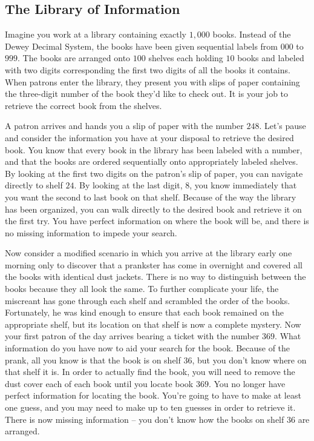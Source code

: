 \documentclass[11pt, oneside]{article}   	%
\begin{document}
\subsection{The Library of Information}
Imagine you work at a library containing exactly $1,000$ books.  Instead of the
Dewey Decimal System, the books have been given sequential labels from $000$ to
$999$.  The books are arranged onto $100$ shelves each holding $10$ books and
labeled with two digits corresponding the first two digits of all the books
it contains.  When patrons enter the library, they present you with slips of
paper containing the three-digit number of the book they'd like to check out.
It is your job to retrieve the correct book from the shelves.

A patron arrives and hands you a slip of paper with the number $248$. Let's
pause and consider the information you have at your disposal to retrieve the
desired book.  You know that every book in the library has been labeled with a
number, and that the books are ordered sequentially onto appropriately labeled
shelves.  By looking at the first two digits on the patron's slip of paper, you
can navigate directly to shelf $24$.  By looking at the last digit, $8$, you
know immediately that you want the second to last book on that shelf.  Because
of the way the library has been organized, you can walk directly to the desired
book and retrieve it on the first try.  You have perfect information on where
the book will be, and there is no missing information to impede your search.

Now consider a modified scenario in which you arrive at the library early one
morning only to discover that a prankster has come in overnight and covered all
the books with identical dust jackets.  There is no way to distinguish between
the books because they all look the same.  To further complicate your life, the
miscreant has gone through each shelf and scrambled the order of the books.
Fortunately, he was kind enough to ensure that each book remained on the
appropriate shelf, but its location on that shelf is now a complete mystery.
Now your first patron of the day arrives bearing a ticket with the number $369$.
What information do you have now to aid your search for the book.  Because of
the prank, all you know is that the book is on shelf $36$, but you don't
know where on that shelf it is.  In order to actually find the book, you will
need to remove the dust cover each of each book until you locate
book $369$.  You no longer have perfect information for locating the book.
You're going to have to make at least one guess, and you may need to make up to
ten guesses in order to retrieve it.  There is now missing information -- you
don't know how the books on shelf $36$ are arranged.
\end{document}
